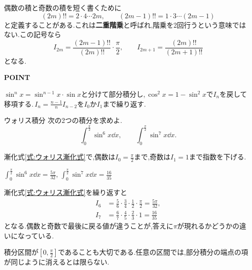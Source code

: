 偶数の積と奇数の積を短く書くために
\[
 (2m)!!=2\cdot4\cdots2m,\qquad
 (2m-1)!!=1\cdot3\cdots(2m-1)
\]
と定義することがある.これは\textbf{二重階乗}と呼ばれ,階乗を2回行うという意味ではない.この記号なら
\[
 I_{2m}=\frac{(2m-1)!!}{(2m)!!}\cdot\frac{\pi}{2},\qquad
 I_{2m+1}=\frac{(2m)!!}{(2m+1)!!}
\]
となる.

\begin{bookpoint}
\textbf{POINT}\par
$\sin^nx=\sin^{n-1}x\cdot\sin x$と分けて部分積分し,\,$\cos^2x=1-\sin^2x$で$I_n$を戻して移項する.\,$I_n=\frac{n-1}{n}I_{n-2}$を$I_0$か$I_1$まで繰り返す.
\end{bookpoint}

\begin{example}{ウォリス積分}
次の2つの積分を求めよ.
\[
 \int_0^{\frac{\pi}{2}}\sin^6x\dd x,\qquad
 \int_0^{\frac{\pi}{2}}\sin^7x\dd x.
\]
\end{example}

漸化式\eqref{式:ウォリス漸化式}で,偶数は$I_0=\frac\pi2$まで,奇数は$I_1=1$まで指数を下げる.

$\int_0^{\frac{\pi}{2}}\sin^6x\dd x=\frac{5\pi}{32}$,\qquad
$\int_0^{\frac{\pi}{2}}\sin^7x\dd x=\frac{16}{35}$

漸化式\eqref{式:ウォリス漸化式}を繰り返すと
\begin{align*}
 I_6&=\frac56\cdot\frac34\cdot\frac12\cdot\frac{\pi}{2}
     =\frac{5\pi}{32},\\
 I_7&=\frac67\cdot\frac45\cdot\frac23\cdot1
     =\frac{16}{35}
\end{align*}
となる.偶数と奇数で最後に戻る値が違うことが,答えに$\pi$が現れるかどうかの違いになっている.

積分区間が$\left[0,\frac{\pi}{2}\right]$であることも大切である.任意の区間では,部分積分の端点の項が同じように消えるとは限らない.

%
%
